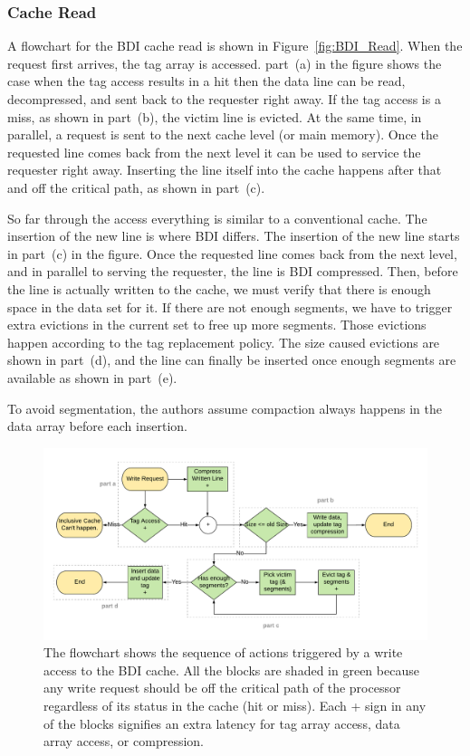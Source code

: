 \subsubsection{Cache Read}
A flowchart for the BDI cache read is shown in Figure~\ref{fig:BDI_Read}. When the request first arrives, the tag array is accessed. part~(a) in the figure shows the case when the tag access results in a hit then the data line can be read, decompressed, and sent back to the requester right away. If the tag access is a miss, as shown in part~(b), the victim line is evicted. At the same time, in parallel, a request is sent to the next cache level (or main memory). Once the requested line comes back from the next level it can be used to service the requester right away. Inserting the line itself into the cache happens after that and off the critical path, as shown in part~(c).\par
So far through the access everything is similar to a conventional cache. The insertion of the new line is where BDI differs. The insertion of the new line starts in part~(c) in the figure. Once the requested line comes back from the next level, and in parallel to serving the requester, the line is BDI compressed. Then, before the line is actually written to the cache, we must verify that there is enough space in the data set for it. If there are not enough segments, we have to trigger extra evictions in the current set to free up more segments. Those evictions happen according to the tag replacement policy. The size caused evictions are shown in part~(d), and the line can finally be inserted once enough segments are available as shown in part~(e).\par
To avoid segmentation, the authors assume compaction always happens in the data array before each insertion.
\begin{figure}[h]
    \includegraphics[width=\textwidth]{BDI_Write.pdf}
    \caption[BDI Write]{The flowchart shows the sequence of actions triggered by a write access to the BDI cache. All the blocks are shaded in green because any write request should be off the critical path of the processor regardless of its status in the cache (hit or miss). Each + sign in any of the blocks signifies an extra latency for tag array access, data array access, or compression.}
    \label{fig:BDI_Write}
\end{figure}
